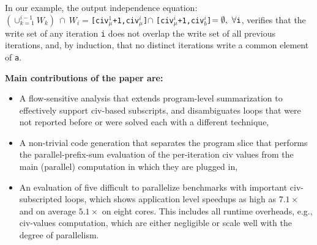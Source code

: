\documentclass{sig-alternate}
\begin{document}
In our example, the output independence equation:\\
$(\cup_{k=1}^{i-1}W_k)~\cap~W_i = ${\tt [civ$_\mu^1$+1,civ$_\mu^i$]}$\cap$
{\tt [civ$_\mu^i$+1,civ$_b^i$]}$ = \emptyset,~\forall \mbox{\tt{}i}$,
verifies that the write set of any iteration {\tt i} does not overlap
the write set of all previous iterations, and, by induction,
that no distinct iterations write a common element of {\tt a}.



{\bf Main contributions of the paper are:}
\begin{itemize}
    \item A flow-sensitive analysis that extends program-level 
            summarization to effectively support {\sc civ}-based 
            subscripts, 
            and disambiguates loops that were not reported 
            before or were solved each with a different technique,

    \item A non-trivial code generation that separates the 
            program slice that performs the parallel-prefix-sum
            evaluation of the per-iteration {\sc civ} values 
            from the main (parallel) computation in which 
            they are plugged in,

    \item An evaluation of five difficult to parallelize benchmarks 
            with important {\sc civ}-subscripted loops, which
            shows application level speedups as high as 
            $7.1\times$ and on average $5.1\times$ on eight cores.
            This includes all runtime overheads, 
            e.g., {\sc civ}-values computation, which are either 
            negligible or scale well with the degree of parallelism.

\end  {itemize}

\enlargethispage{\baselineskip}
\end{document}
